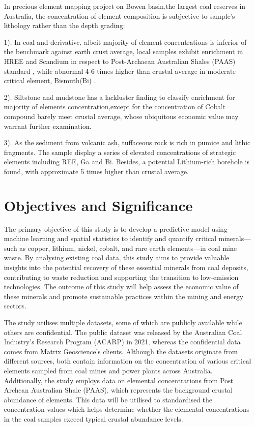 \documentclass[11pt,a4paper,]{article}
\begin{document}
In precious \textcite{Hodgkinson2020} element mapping project on Bowen basin,the largest coal reserves in Australia, the concentration of element composition is subjective to sample's lithology rather than the depth grading:

1). In coal and derivative, albeit majority of element concentrations is inferior of the benchmark against earth crust average, local samples exhibit enrichment in HREE and Scandium in respect to \textcite{McLennan2011} Post-Archaean Australian Shales (PAAS) standard , while abnormal 4-6 times higher than crustal average in moderate critical element, Bismuth(Bi) .

2). Siltstone and mudstone has a lackluster finding to classify enrichment for majority of elements concentration,except for the concentration of Cobalt compound barely meet crustal average, whose ubiquitous economic value may warrant further examination.

3). As the sediment from volcanic ash, tuffaceous rock is rich in pumice and lithic fragments. The sample display a series of elevated concentrations of strategic elements including REE, Ga and Bi. Besides, a potential Lithium-rich borehole is found, with approximate 5 times higher than crustal average.

\section{Objectives and Significance}\label{objectives-and-significance}

The primary objective of this study is to develop a predictive model using machine learning and spatial statistics to identify and quantify critical minerals---such as copper, lithium, nickel, cobalt, and rare earth elements---in coal mine waste. By analysing existing coal data, this study aims to provide valuable insights into the potential recovery of these essential minerals from coal deposits, contributing to waste reduction and supporting the transition to low-emission technologies. The outcome of this study will help assess the economic value of these minerals and promote sustainable practices within the mining and energy sectors.

The study utilises multiple datasets, some of which are publicly available while others are confidential. The public dataset was released by the Australian Coal Industry's Research Program (ACARP) in 2021, whereas the confidential data comes from Matrix Geoscience's clients. Although the datasets originate from different sources, both contain information on the concentration of various critical elements sampled from coal mines and power plants across Australia. Additionally, the study employs data on elemental concentrations from Post Archean Australian Shale (PAAS), which represents the background crustal abundance of elements. This data will be utilised to standardised the concentration values which helps determine whether the elemental concentrations in the coal samples exceed typical crustal abundance levels.
\end{document}

